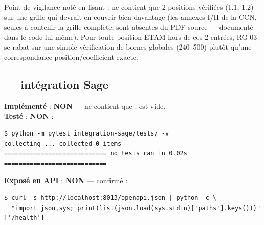 \documentclass[11pt,a4paper]{article}
\newcommand{\etat}[2]{\textbf{#1} : #2}
\newcommand{\ko}{\textcolor{red!60!black}{\textbf{NON}}}
\begin{document}
Point de vigilance not\'e en lisant  :  ne contient que 2 positions v\'erifi\'ees (1.1, 1.2) sur une grille qui devrait en couvrir bien davantage (les annexes I/II de la CCN, seules \`a contenir la grille compl\`ete, sont absentes du PDF source --- document\'e dans le code lui-m\^eme). Pour toute position ETAM hors de ces 2 entr\'ees, RG-03 se rabat sur une simple v\'erification de bornes globales (240--500) plut\^ot qu'une correspondance position/coefficient exacte.

\subsection{ --- int\'egration Sage}
\label{sec:sage}
\etat{Impl\'ement\'e}{\ko} ---  ne contient que .  est vide.\\
\etat{Test\'e}{\ko} :
\begin{lstlisting}
$ python -m pytest integration-sage/tests/ -v
collecting ... collected 0 items
============================ no tests ran in 0.02s ============================
\end{lstlisting}
\etat{Expos\'e en API}{\ko} --- confirm\'e :
\begin{lstlisting}
$ curl -s http://localhost:8013/openapi.json | python -c \
  "import json,sys; print(list(json.load(sys.stdin)['paths'].keys()))"
['/health']
\end{lstlisting}
\end{document}
